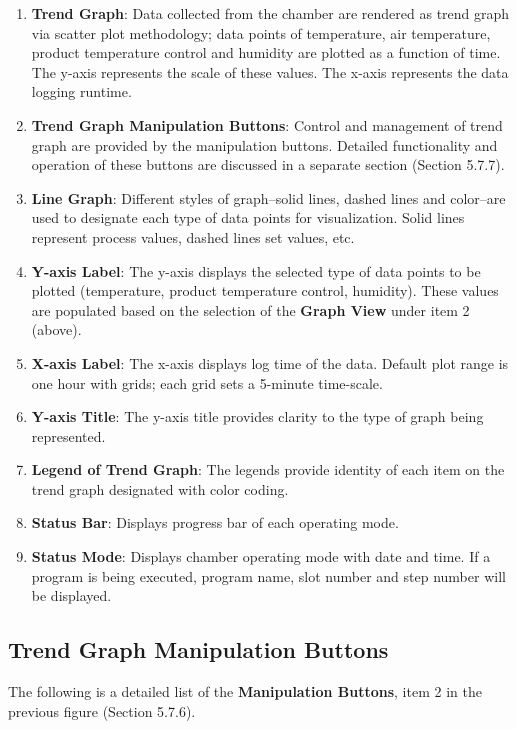 \begin{enumerate}
\def\labelenumi{\arabic{enumi}.}
\tightlist
\item
  \textbf{Trend Graph}: Data collected from the chamber are rendered as
  trend graph via scatter plot methodology; data points of temperature,
  air temperature, product temperature control and humidity are plotted
  as a function of time. The y-axis represents the scale of these
  values. The x-axis represents the data logging runtime.
\item
  \textbf{Trend Graph Manipulation Buttons}: Control and management of
  trend graph are provided by the manipulation buttons. Detailed
  functionality and operation of these buttons are discussed in a
  separate section (Section 5.7.7).
\item
  \textbf{Line Graph}: Different styles of graph--solid lines, dashed
  lines and color--are used to designate each type of data points for
  visualization. Solid lines represent process values, dashed lines set
  values, etc.\\
\item
  \textbf{Y-axis Label}: The y-axis displays the selected type of data
  points to be plotted (temperature, product temperature control,
  humidity). These values are populated based on the selection of the
  \textbf{Graph View} under item 2 (above).
\item
  \textbf{X-axis Label}: The x-axis displays log time of the data.
  Default plot range is one hour with grids; each grid sets a 5-minute
  time-scale.
\item
  \textbf{Y-axis Title}: The y-axis title provides clarity to the type
  of graph being represented.
\item
  \textbf{Legend of Trend Graph}: The legends provide identity of each
  item on the trend graph designated with color coding.
\item
  \textbf{Status Bar}: Displays progress bar of each operating mode.
\item
  \textbf{Status Mode}: Displays chamber operating mode with date and
  time. If a program is being executed, program name, slot number and
  step number will be displayed.
\end{enumerate}


\subsection{Trend Graph Manipulation
Buttons}

The following is a detailed list of the \textbf{Manipulation Buttons},
item 2 in the previous figure (Section 5.7.6).

